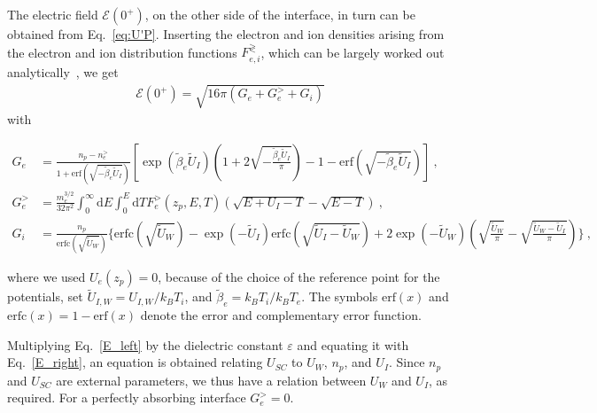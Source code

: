 \documentclass[pre,reprint,floats]{revtex4-1}
\newcommand{\rmd}{\ensuremath{\mathrm{d}}}
\newcommand{\erf}{\ensuremath{\mathrm{erf}}}
\begin{document}
The electric field $\mathcal{E}(0^+)$, on the other side of the interface, in turn can be obtained 
from Eq.~\eqref{eq:U'P}. Inserting the electron and ion densities arising from the electron and ion distribution 
functions $F_{e,i}^\gtrless$, which can be largely worked out analytically~\cite{RBF20}, 
we get   
\begin{align}
\label{E_right}
\mathcal{E}(0^+)=\sqrt{16\pi\left(G_e + G_e^> + G_i\right)}
\end{align}
with 
\begin{widetext}
\begin{align}
G_e   &= \frac{n_p-n_e^>}{1 + \mathrm{erf}\left(\sqrt{-\tilde{\beta}_e \tilde{U}_I}\right)}
      \left[\exp\left( \tilde{\beta}_e \tilde{U}_I \right)\left(1 + 2\sqrt{-\frac{\tilde{\beta}_e \tilde{U}_I}{\pi}}\right) 
      - 1 - \mathrm{erf}\left(\sqrt{-\tilde{\beta}_e \tilde{U}_I}\right)  \right]~,\\
G_e^> &= \frac{m_e^{3/2}}{32\pi^2}
      \int_{0}^\infty \rmd E\int_{0}^{E} \rmd T F_e^>(z_p,E,T) 
      \left( \sqrt{E+U_I -T}-\sqrt{E-T} \right)~, \\
G_i   &= \frac{n_p}{\mathrm{erfc}\left(\sqrt{\tilde{U}_W}\right)}
      \bigg\{\mathrm{erfc}\left(\sqrt{\tilde{U}_W}\right) - \exp\left(-\tilde{U}_I\right) 
      \mathrm{erfc}\left(\sqrt{\tilde{U}_I-\tilde{U}_W}\right)
      + 2 \exp\left(-\tilde{U}_W\right)\left( \sqrt{\frac{\tilde{U}_W}{\pi}} 
      - \sqrt{\frac{\tilde{U}_W-\tilde{U}_I}{\pi}} \right) \bigg\}~,
\end{align}
\end{widetext}
where we used $U_e(z_p)=0$, because of the choice of the reference point for the potentials,
set $\tilde{U}_{I,W} = U_{I,W}/k_B T_i$, and $\tilde{\beta}_e = k_B T_i/k_B T_e$. The symbols 
$\mathrm{erf}(x)$ and $\mathrm{erfc}(x)=1-\erf(x)$ denote the error and complementary error 
function.

Multiplying Eq.~\eqref{E_left} by the dielectric constant $\varepsilon$ and equating it with
Eq.~\eqref{E_right}, an equation is obtained relating $U_{SC}$ to $U_W$, $n_p$, and $U_I$. Since 
$n_p$ and $U_{SC}$ are external parameters, we thus have a relation between $U_W$ and $U_I$, as 
required. For a perfectly absorbing interface $G_e^>=0$. 
	
\end{document}
